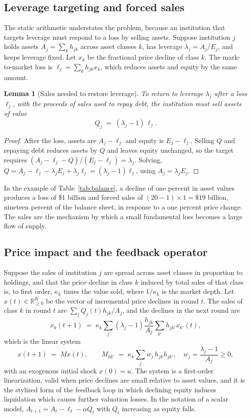 \documentclass[11pt]{article}
\newtheorem{lemma}[theorem]{Lemma}
\theoremstyle{definition}
\theoremstyle{remark}
\newcommand{\Real}{\mathbb{R}}
\begin{document}
\subsection{Leverage targeting and forced sales}

The static arithmetic understates the problem, because an institution that targets leverage must respond to a loss by selling assets. Suppose institution $j$ holds assets $A_j=\sum_k h_{jk}$ across asset classes $k$, has leverage $\lambda_j=A_j/E_j$, and keeps leverage fixed. Let $x_k$ be the fractional price decline of class $k$. The mark-to-market loss is $\ell_j=\sum_k h_{jk}x_k$, which reduces assets and equity by the same amount.

\begin{lemma}[Sales needed to restore leverage]\label{lem:sales}
To return to leverage $\lambda_j$ after a loss $\ell_j$, with the proceeds of sales used to repay debt, the institution must sell assets of value
\[
Q_j\;=\;(\lambda_j-1)\,\ell_j .
\]
\end{lemma}

\begin{proof}
After the loss, assets are $A_j-\ell_j$ and equity is $E_j-\ell_j$. Selling $Q$ and repaying debt reduces assets by $Q$ and leaves equity unchanged, so the target requires $(A_j-\ell_j-Q)/(E_j-\ell_j)=\lambda_j$. Solving, $Q=A_j-\ell_j-\lambda_jE_j+\lambda_j\ell_j=(\lambda_j-1)\ell_j$, using $A_j=\lambda_jE_j$.
\end{proof}

In the example of Table~\ref{tab:balance}, a decline of one percent in asset values produces a loss of \$1 billion and forced sales of $(20-1)\times 1=\$19$ billion, nineteen percent of the balance sheet, in response to a one percent price change. The sales are the mechanism by which a small fundamental loss becomes a large flow of supply.

\subsection{Price impact and the feedback operator}

Suppose the sales of institution $j$ are spread across asset classes in proportion to holdings, and that the price decline in class $k$ induced by total sales of that class is, to first order, $\kappa_k$ times the value sold, where $1/\kappa_k$ is the market depth. Let $x(t)\in\Real_{\ge 0}^K$ be the vector of incremental price declines in round $t$. The sales of class $k$ in round $t$ are $\sum_j Q_j(t)h_{jk}/A_j$, and the declines in the next round are
\[
x_k(t+1)\;=\;\kappa_k\sum_j(\lambda_j-1)\frac{h_{jk}}{A_j}\sum_{k'}h_{jk'}x_{k'}(t),
\]
which is the linear system
\[
x(t+1)\;=\;Mx(t),\qquad M_{kk'}\;=\;\kappa_k\sum_j w_j\,h_{jk}h_{jk'},\quad w_j=\frac{\lambda_j-1}{A_j}\ge 0 ,
\]
with an exogenous initial shock $x(0)=u$. The system is a first-order linearization, valid when price declines are small relative to asset values, and it is the stylized form of the feedback loop in which declining equity induces liquidation which causes further valuation losses. In the notation of a scalar model, $A_{t+1}=A_t-\ell_t-\alpha Q_t$ with $Q_t$ increasing as equity falls.
\end{document}
